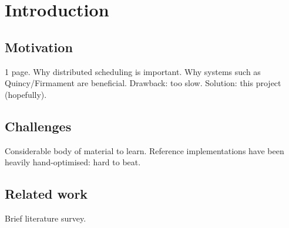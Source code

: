\chapter{Introduction} \label{chap:intro}

\section{Motivation} \label{sec:intro-motivation}
1 page. Why distributed scheduling is important. Why systems such as Quincy/Firmament are beneficial. Drawback: too slow. Solution: this project (hopefully). 

\section{Challenges} \label{sec:intro-challenges}
Considerable body of material to learn. Reference implementations have been heavily hand-optimised: hard to beat. 

\section{Related work} \label{sec:intro-related-work}
Brief literature survey.

